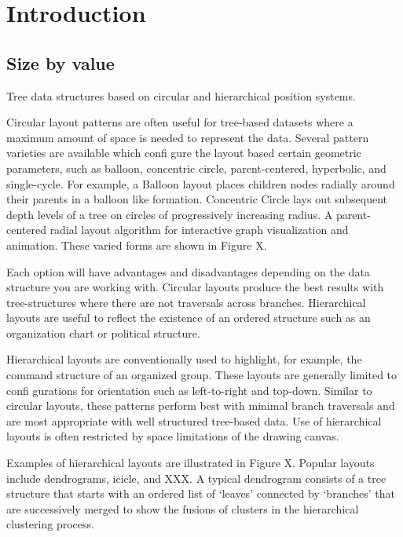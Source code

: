 \section{Introduction}\label{charts-intro}

\subsection{Size by value}\label{size-by-value}

Tree data structures based on circular and hierarchical position systems.

Circular layout patterns are often useful for tree-based datasets where a maximum amount of space is needed to represent the data. Several pattern varieties are available which confi gure the layout based certain geometric parameters, such as balloon, concentric circle, parent-centered, hyperbolic, and single-cycle. For example, a Balloon layout places children nodes radially around their parents in a balloon like formation. Concentric Circle lays out subsequent depth levels of a tree on circles of progressively increasing radius. A parent-centered radial layout algorithm for interactive graph visualization and animation. These varied forms are shown in Figure X.

Each option will have advantages and disadvantages depending on the data structure you are working with. Circular layouts produce the best results with tree-structures where there are not traversals across branches. Hierarchical layouts are useful to reflect the existence of an ordered structure such as an organization chart or political structure. 

Hierarchical layouts are conventionally used to highlight, for example, the command structure of an organized group. These layouts are generally limited to confi gurations for orientation such as left-to-right and top-down. Similar to circular layouts, these patterns perform best with minimal branch traversals and are most appropriate with well structured tree-based data. Use of hierarchical layouts is often restricted by space limitations of the drawing canvas.

Examples of hierarchical layouts are illustrated in Figure X. Popular layouts include dendrograms, icicle, and XXX. A typical dendrogram consists of a tree structure that starts with an ordered list of ‘leaves’ connected by ‘branches’ that are successively merged to show the fusions of clusters in the hierarchical clustering process. 

